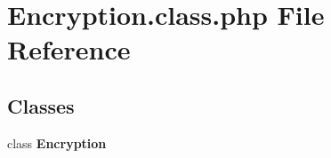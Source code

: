 \section{Encryption.class.php File Reference}
\label{Encryption_8class_8php}
\subsection*{Classes}
\begin{CompactItemize}
\item 
class {\bf Encryption}
\end{CompactItemize}
